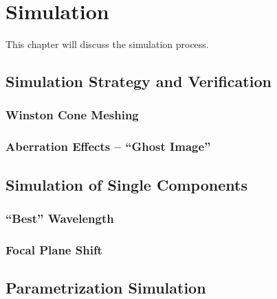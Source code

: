 \chapter{\iceact Simulation}\label{chap:iceact_sim}

This chapter will discuss the \geant simulation process. 

\section{Simulation Strategy and Verification}

\subsection{Winston Cone Meshing}\label{sec:wico_meshing}

\subsection{Aberration Effects -- \enquote{Ghost Image}}\label{sec:ghost_image}

\section{Simulation of Single Components}

\subsection{\enquote{Best} Wavelength}

\subsection{Focal Plane Shift}

\section{Parametrization Simulation}